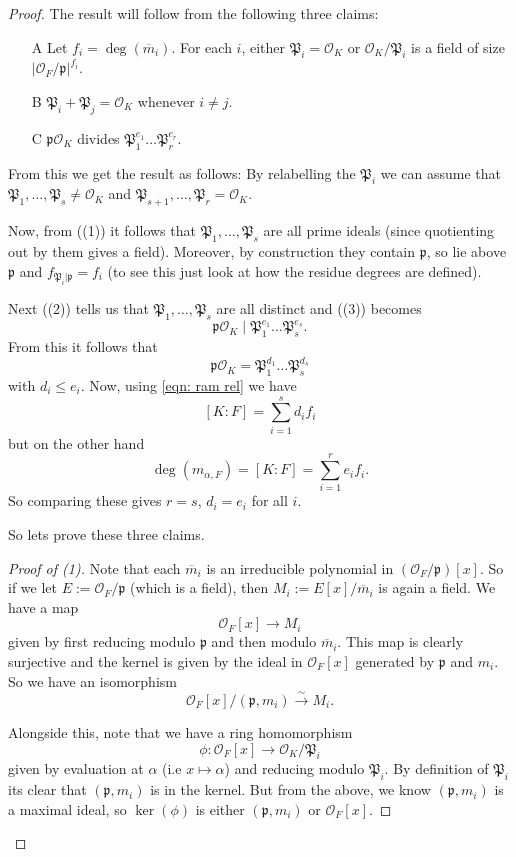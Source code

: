 \documentclass[11pt,a4paper]{report}
\theoremstyle{plain}
\theoremstyle{definition}
\theoremstyle{definition}
\def \gothP{\mathfrak{P}}
\def\gothp{\mathfrak{p}}
\def \a{\alpha}
\def \OO {\mathcal{O}}
\def \ov{\overline}
\def \lra{\longrightarrow}
\begin{document}
\begin{proof}
The result will  follow from the following three claims:
\begin{enumerate}[(A)]
	\item[A] Let $f_i=\deg(\ov{m}_i)$. For each $i$, either  $\gothP_i=\OO_K$ or $\OO_K/\gothP_i$ is a field of size $|\OO_F/\gothp|^{f_i}$.
	\item[B] $\gothP_i+\gothP_j=\OO_K$ whenever $i \neq j$.
	\item [C] $\gothp\OO_K$ divides $\gothP_1^{e_1}\dots\gothP_r^{e_r}$.
\end{enumerate}

From this we get the result as follows: By relabelling the $\gothP_i$ we can assume that  $\gothP_1,\dots,\gothP_s \neq \OO_K$ and $\gothP_{s+1},\dots,\gothP_r=\OO_K$. 

Now, from ((1)) it follows that  $\gothP_1,\dots,\gothP_s$ are all prime ideals (since quotienting out by them gives a field). Moreover, by construction they contain $\gothp$, so lie above $\gothp$ and $f_{\gothP_i|\gothp}=f_i$ (to see this just look at how the residue degrees are defined).

Next ((2)) tells us that  $\gothP_1,\dots,\gothP_s$ are all distinct and ((3)) becomes \[\gothp\OO_K \mid \gothP_1^{e_1}\dots\gothP_s^{e_s}.\] From this it follows that \[\gothp\OO_K = \gothP_1^{d_1}\dots\gothP_s^{d_s}\] with $d_i \leq e_i$. Now, using \ref{eqn: ram rel} we have \[[K:F]=\sum_{i=1}^s d_if_i\] but on the other hand \[\deg(m_{\a,F})=[K:F]=\sum_{i=1}^r e_if_i.\] So comparing these gives $r=s$, $d_i=e_i$ for all $i$.

So lets prove these three claims.

\begin{proof}[Proof of (1)]
	Note that each $\ov{m}_i$ is an irreducible polynomial in $(\OO_F/\gothp)[x]$. So if we let $E:=\OO_F/\gothp$ (which is a field), then $M_i:=E[x]/\ov{m}_i$ is again a field. We have a map \[\OO_F[x] \lra M_i\] given by first reducing modulo $\gothp$ and then modulo $\ov{m}_i$. This map is clearly surjective and the kernel is given by the ideal in $\OO_F[x]$ generated by $\gothp$ and $m_i$. So we have an isomorphism \[\OO_F[x]/(\gothp,m_i) \overset{\sim}{\lra} M_i.\]
	
	Alongside this, note that we have a ring homomorphism \[\phi:\OO_F[x] \lra \OO_K/\gothP_i\] given by evaluation at $\a$  (i.e $x \mapsto \a$) and reducing modulo $\gothP_i$. By definition of $\gothP_i$ its clear that $(\gothp,m_i)$ is in the kernel. But from the above, we know $(\gothp,m_i)$ is a maximal ideal, so $\ker(\phi)$ is either $(\gothp,m_i)$ or $\OO_F[x]$.
	

\end{proof}
\end{proof}
\end{document}
